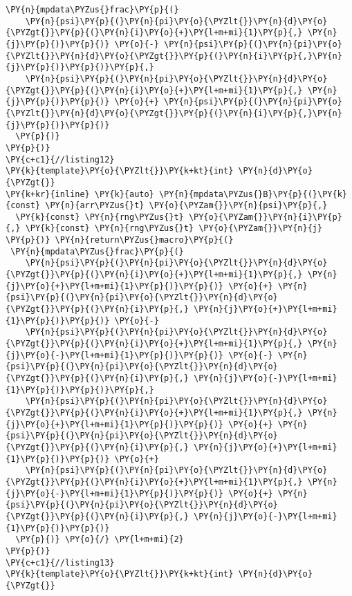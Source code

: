 \begin{Verbatim}[commandchars=\\\{\}]
  \PY{n}{mpdata\PYZus{}frac}\PY{p}{(}
    \PY{n}{psi}\PY{p}{(}\PY{n}{pi}\PY{o}{\PYZlt{}}\PY{n}{d}\PY{o}{\PYZgt{}}\PY{p}{(}\PY{n}{i}\PY{o}{+}\PY{l+m+mi}{1}\PY{p}{,} \PY{n}{j}\PY{p}{)}\PY{p}{)} \PY{o}{-} \PY{n}{psi}\PY{p}{(}\PY{n}{pi}\PY{o}{\PYZlt{}}\PY{n}{d}\PY{o}{\PYZgt{}}\PY{p}{(}\PY{n}{i}\PY{p}{,}\PY{n}{j}\PY{p}{)}\PY{p}{)}\PY{p}{,}
    \PY{n}{psi}\PY{p}{(}\PY{n}{pi}\PY{o}{\PYZlt{}}\PY{n}{d}\PY{o}{\PYZgt{}}\PY{p}{(}\PY{n}{i}\PY{o}{+}\PY{l+m+mi}{1}\PY{p}{,} \PY{n}{j}\PY{p}{)}\PY{p}{)} \PY{o}{+} \PY{n}{psi}\PY{p}{(}\PY{n}{pi}\PY{o}{\PYZlt{}}\PY{n}{d}\PY{o}{\PYZgt{}}\PY{p}{(}\PY{n}{i}\PY{p}{,}\PY{n}{j}\PY{p}{)}\PY{p}{)}
  \PY{p}{)} 
\PY{p}{)} 
\PY{c+c1}{//listing12}
\PY{k}{template}\PY{o}{\PYZlt{}}\PY{k+kt}{int} \PY{n}{d}\PY{o}{\PYZgt{}}
\PY{k+kr}{inline} \PY{k}{auto} \PY{n}{mpdata\PYZus{}B}\PY{p}{(}\PY{k}{const} \PY{n}{arr\PYZus{}t} \PY{o}{\PYZam{}}\PY{n}{psi}\PY{p}{,} 
  \PY{k}{const} \PY{n}{rng\PYZus{}t} \PY{o}{\PYZam{}}\PY{n}{i}\PY{p}{,} \PY{k}{const} \PY{n}{rng\PYZus{}t} \PY{o}{\PYZam{}}\PY{n}{j}
\PY{p}{)} \PY{n}{return\PYZus{}macro}\PY{p}{(}
 \PY{n}{mpdata\PYZus{}frac}\PY{p}{(}
    \PY{n}{psi}\PY{p}{(}\PY{n}{pi}\PY{o}{\PYZlt{}}\PY{n}{d}\PY{o}{\PYZgt{}}\PY{p}{(}\PY{n}{i}\PY{o}{+}\PY{l+m+mi}{1}\PY{p}{,} \PY{n}{j}\PY{o}{+}\PY{l+m+mi}{1}\PY{p}{)}\PY{p}{)} \PY{o}{+} \PY{n}{psi}\PY{p}{(}\PY{n}{pi}\PY{o}{\PYZlt{}}\PY{n}{d}\PY{o}{\PYZgt{}}\PY{p}{(}\PY{n}{i}\PY{p}{,} \PY{n}{j}\PY{o}{+}\PY{l+m+mi}{1}\PY{p}{)}\PY{p}{)} \PY{o}{-}
    \PY{n}{psi}\PY{p}{(}\PY{n}{pi}\PY{o}{\PYZlt{}}\PY{n}{d}\PY{o}{\PYZgt{}}\PY{p}{(}\PY{n}{i}\PY{o}{+}\PY{l+m+mi}{1}\PY{p}{,} \PY{n}{j}\PY{o}{-}\PY{l+m+mi}{1}\PY{p}{)}\PY{p}{)} \PY{o}{-} \PY{n}{psi}\PY{p}{(}\PY{n}{pi}\PY{o}{\PYZlt{}}\PY{n}{d}\PY{o}{\PYZgt{}}\PY{p}{(}\PY{n}{i}\PY{p}{,} \PY{n}{j}\PY{o}{-}\PY{l+m+mi}{1}\PY{p}{)}\PY{p}{)}\PY{p}{,}
    \PY{n}{psi}\PY{p}{(}\PY{n}{pi}\PY{o}{\PYZlt{}}\PY{n}{d}\PY{o}{\PYZgt{}}\PY{p}{(}\PY{n}{i}\PY{o}{+}\PY{l+m+mi}{1}\PY{p}{,} \PY{n}{j}\PY{o}{+}\PY{l+m+mi}{1}\PY{p}{)}\PY{p}{)} \PY{o}{+} \PY{n}{psi}\PY{p}{(}\PY{n}{pi}\PY{o}{\PYZlt{}}\PY{n}{d}\PY{o}{\PYZgt{}}\PY{p}{(}\PY{n}{i}\PY{p}{,} \PY{n}{j}\PY{o}{+}\PY{l+m+mi}{1}\PY{p}{)}\PY{p}{)} \PY{o}{+}
    \PY{n}{psi}\PY{p}{(}\PY{n}{pi}\PY{o}{\PYZlt{}}\PY{n}{d}\PY{o}{\PYZgt{}}\PY{p}{(}\PY{n}{i}\PY{o}{+}\PY{l+m+mi}{1}\PY{p}{,} \PY{n}{j}\PY{o}{-}\PY{l+m+mi}{1}\PY{p}{)}\PY{p}{)} \PY{o}{+} \PY{n}{psi}\PY{p}{(}\PY{n}{pi}\PY{o}{\PYZlt{}}\PY{n}{d}\PY{o}{\PYZgt{}}\PY{p}{(}\PY{n}{i}\PY{p}{,} \PY{n}{j}\PY{o}{-}\PY{l+m+mi}{1}\PY{p}{)}\PY{p}{)}
  \PY{p}{)} \PY{o}{/} \PY{l+m+mi}{2}
\PY{p}{)}
\PY{c+c1}{//listing13}
\PY{k}{template}\PY{o}{\PYZlt{}}\PY{k+kt}{int} \PY{n}{d}\PY{o}{\PYZgt{}}

\end{Verbatim}
